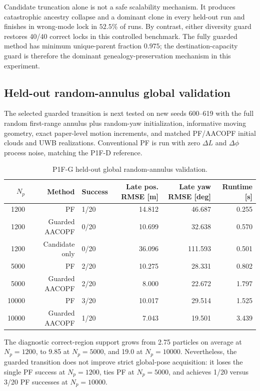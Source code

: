 Candidate truncation alone is not a safe scalability mechanism. It produces catastrophic ancestry collapse and a dominant clone in every held-out run and finishes in wrong-mode lock in \(52.5\%\) of runs. By contrast, either diversity guard restores 40/40 correct locks in this controlled benchmark. The fully guarded method has minimum unique-parent fraction \(0.975\); the destination-capacity guard is therefore the dominant genealogy-preservation mechanism in this experiment.

\subsection{Held-out random-annulus global validation}
The selected guarded transition is next tested on new seeds 600--619 with the full random first-range annulus plus random-yaw initialization, informative moving geometry, exact paper-level motion increments, and matched PF/AACOPF initial clouds and UWB realizations. Conventional PF is run with zero \(\Delta L\) and \(\Delta\phi\) process noise, matching the P1F-D reference.

\begin{table}[htbp]
    \centering
    \caption{P1F-G held-out global random-annulus validation.}
    \label{tab:p1fg_global}
    \begin{tabular}{rrlrrr}
        \toprule
        \(N_p\) & Method & Success & Late pos. RMSE [m] & Late yaw RMSE [deg] & Runtime [s]\\
        \midrule
        1200  & PF              & 1/20 & 14.812 & 46.687 & 0.255\\
        1200  & Guarded AACOPF  & 0/20 & 10.699 & 32.638 & 0.570\\
        1200  & Candidate only  & 0/20 & 36.096 & 111.593 & 0.501\\
        5000  & PF              & 2/20 & 10.275 & 28.331 & 0.802\\
        5000  & Guarded AACOPF  & 2/20 & 8.000  & 22.672 & 1.797\\
        10000 & PF              & 3/20 & 10.017 & 29.514 & 1.525\\
        10000 & Guarded AACOPF  & 1/20 & 7.043  & 19.501 & 3.439\\
        \bottomrule
    \end{tabular}
\end{table}

The diagnostic correct-region support grows from 2.75 particles on average at \(N_p=1200\), to 9.85 at \(N_p=5000\), and 19.0 at \(N_p=10000\). Nevertheless, the guarded transition does not improve strict global-pose acquisition: it loses the single PF success at \(N_p=1200\), ties PF at \(N_p=5000\), and achieves 1/20 versus 3/20 PF successes at \(N_p=10000\).


